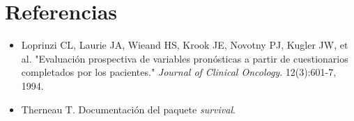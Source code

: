 \documentclass[a4paper,12pt]{article}
\begin{document}
\section*{Referencias}
\begin{itemize}
    \item Loprinzi CL, Laurie JA, Wieand HS, Krook JE, Novotny PJ, Kugler JW, et al. "Evaluación prospectiva de variables pronósticas a partir de cuestionarios completados por los pacientes." \textit{Journal of Clinical Oncology}. 12(3):601-7, 1994.
    \item Therneau T. Documentación del paquete \textit{survival}.
\end{itemize}
	
\end{document}
